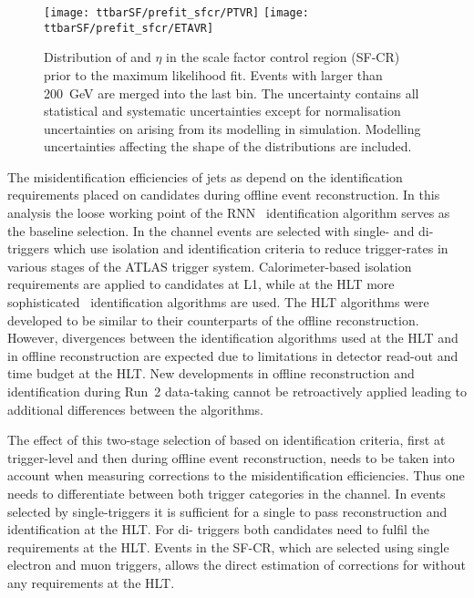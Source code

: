 \begin{figure}[htbp]
  \centering

  \texttt{[image: ttbarSF/prefit\_sfcr/PTVR]}%
  \texttt{[image: ttbarSF/prefit\_sfcr/ETAVR]}

  \caption{Distribution of \tauhadvis \pT and $\eta$ in the scale
    factor control region (SF-CR) prior to the maximum likelihood
    fit. Events with \tauhadvis \pT larger than \SI{200}{\GeV} are
    merged into the last bin. The uncertainty contains all statistical
    and systematic uncertainties except for normalisation
    uncertainties on \ttbar arising from its modelling in
    simulation. Modelling uncertainties affecting the shape of the
    distributions are included.}
  \label{fig:ttbarSF_prefit_pt}
\end{figure}

The misidentification efficiencies of jets as \tauhadvis depend on the
identification requirements placed on \tauhadvis candidates during
offline event reconstruction. In this analysis the loose working point
of the RNN \tauhadvis~identification algorithm serves as the baseline
selection. In the \hadhad channel events are selected with single- and
di-\tauhadvis triggers which use isolation and identification criteria
to reduce trigger-rates in various stages of the ATLAS trigger
system. Calorimeter-based isolation requirements are applied to
\tauhadvis candidates at L1, while at the HLT more sophisticated
\tauhadvis~identification algorithms are used.  The HLT algorithms
were developed to be similar to their counterparts of the offline
\tauhadvis reconstruction. However, divergences between the
identification algorithms used at the HLT and in offline \tauhadvis
reconstruction are expected due to limitations in detector read-out
and time budget at the HLT. New developments in offline \tauhadvis
reconstruction and identification during Run~2 data-taking cannot be
retroactively applied leading to additional differences between the
algorithms.

The effect of this two-stage selection of \tauhadvis based on
identification criteria, first at trigger-level and then during
offline event reconstruction, needs to be taken into account when
measuring corrections to the \jettotauhadvis misidentification
efficiencies. Thus one needs to differentiate between both trigger
categories in the \hadhad channel. In events selected by
single-\tauhadvis triggers it is sufficient for a single \tauhadvis to
pass reconstruction and identification at the HLT. For di-\tauhadvis
triggers both candidates need to fulfil the requirements at the HLT.
Events in the SF-CR, which are selected using single electron and muon
triggers, allows the direct estimation of corrections for \tauhadvis
without any requirements at the HLT.

